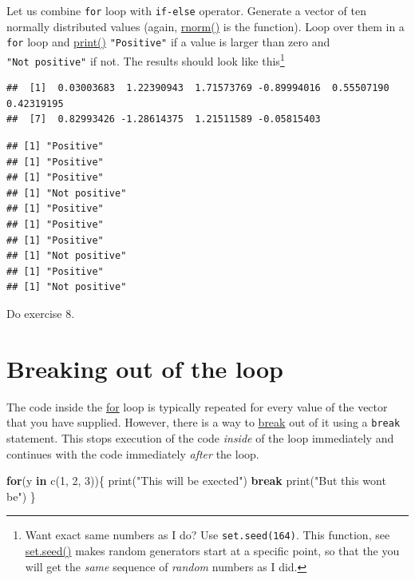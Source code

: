 \documentclass[
]{book}
\newenvironment{Shaded}{\begin{snugshade}}{\end{snugshade}}
\newcommand{\ControlFlowTok}[1]{\textcolor[rgb]{0.13,0.29,0.53}{\textbf{#1}}}
\newcommand{\DecValTok}[1]{\textcolor[rgb]{0.00,0.00,0.81}{#1}}
\newcommand{\FunctionTok}[1]{\textcolor[rgb]{0.00,0.00,0.00}{#1}}
\newcommand{\NormalTok}[1]{#1}
\newcommand{\StringTok}[1]{\textcolor[rgb]{0.31,0.60,0.02}{#1}}
\begin{document}
Let us combine \texttt{for} loop with \texttt{if-else} operator. Generate a vector of ten normally distributed values (again, \href{https://stat.ethz.ch/R-manual/R-devel/library/stats/html/Normal.html}{rnorm()} is the function). Loop over them in a \texttt{for} loop and \href{https://stat.ethz.ch/R-manual/R-devel/library/base/html/print.html}{print()} \texttt{"Positive"} if a value is larger than zero and \texttt{"Not\ positive"} if not. The results should look like this\footnote{Want exact same numbers as I do? Use \texttt{set.seed(164)}. This function, see \href{https://stat.ethz.ch/R-manual/R-devel/library/base/html/Random.html}{set.seed()} makes random generators start at a specific point, so that the you will get the \emph{same} sequence of \emph{random} numbers as I did.}

\begin{verbatim}
##  [1]  0.03003683  1.22390943  1.71573769 -0.89994016  0.55507190  0.42319195
##  [7]  0.82993426 -1.28614375  1.21511589 -0.05815403
\end{verbatim}

\begin{verbatim}
## [1] "Positive"
## [1] "Positive"
## [1] "Positive"
## [1] "Not positive"
## [1] "Positive"
## [1] "Positive"
## [1] "Positive"
## [1] "Not positive"
## [1] "Positive"
## [1] "Not positive"
\end{verbatim}

Do exercise 8.

\hypertarget{breaking-out-of-the-loop}{%
\section{Breaking out of the loop}\label{breaking-out-of-the-loop}}

The code inside the \href{https://stat.ethz.ch/R-manual/R-devel/library/base/html/Control.html}{for} loop is typically repeated for every value of the vector that you have supplied. However, there is a way to \href{https://stat.ethz.ch/R-manual/R-devel/library/base/html/Control.html}{break} out of it using a \texttt{break} statement. This stops execution of the code \emph{inside} of the loop immediately and continues with the code immediately \emph{after} the loop.

\begin{Shaded}
\begin{Highlighting}[]
\ControlFlowTok{for}\NormalTok{(y }\ControlFlowTok{in} \FunctionTok{c}\NormalTok{(}\DecValTok{1}\NormalTok{, }\DecValTok{2}\NormalTok{, }\DecValTok{3}\NormalTok{))\{}
  \FunctionTok{print}\NormalTok{(}\StringTok{"This will be exected"}\NormalTok{)}
  \ControlFlowTok{break}
  \FunctionTok{print}\NormalTok{(}\StringTok{"But this won\textquotesingle{}t be"}\NormalTok{)}
\NormalTok{\}}
\end{Highlighting}
\end{Shaded}
\end{document}
